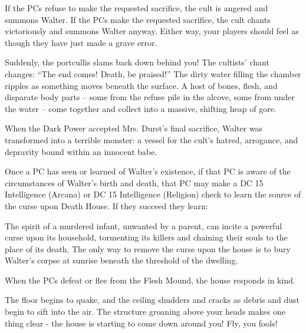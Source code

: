 If the PCs refuse to make the requested sacrifice, the cult is angered and summons Walter. If the PCs make the
requested sacrifice, the cult chants victoriously and summons Walter anyway. Either way, your players should
feel as though they have just made a grave error.
\begin{readout}
  Suddenly, the portcullis slams back down behind you! The cultists' chant changes: ``The end comes! Death, be
  praised!'' The dirty water filling the chamber ripples as something moves beneath the surface.
  A host of bones, flesh, and disparate body parts -- some from the refuse pile in the alcove, some from
  under the water -- come together and collect into a massive, shifting heap of gore.
\end{readout}
When the Dark Power accepted Mrs. Durst's final sacrifice, Walter was transformed into a terrible monster: a 
vessel for the cult's hatred, arrogance, and depravity bound within an innocent babe.

Once a PC has seen or learned of Walter's existence, if that PC is aware of the circumstances of Walter's birth
and death, that PC may make a DC 15 Intelligence (Arcana) or DC 15 Intelligence (Religion) check to learn the
source of the curse upon Death House. If they succeed they learn:
\begin{readout}
  The spirit of a murdered infant, unwanted by a parent, can incite a powerful curse upon its household, 
  tormenting its killers and chaining their souls to the place of its death. The only way to remove the curse
  upon the house is to bury Walter's corpse at sunrise beneath the threshold of the dwelling.
\end{readout}
When the PCs defeat or flee from the Flesh Mound, the house responds in kind.
\begin{readout}
  The floor begins to quake, and the ceiling shudders and cracks as debris and dust begin to sift into the air.
  The structure groaning above your heads makes one thing clear - the house is starting to come down around you!
  Fly, you fools!
\end{readout}

\begin{arealinks}
  \item {}
\end{arealinks}
